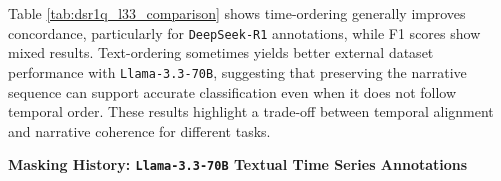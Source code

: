 \vspace{1em}

Table \ref{tab:dsr1q_l33_comparison} shows time-ordering generally improves concordance, particularly for \texttt{DeepSeek-R1} annotations, while F1 scores show mixed results. Text-ordering sometimes yields better external dataset performance with \texttt{Llama-3.3-70B}, suggesting that preserving the narrative sequence can support accurate classification even when it does not follow temporal order.  These results highlight a trade-off between temporal alignment and narrative coherence for different tasks.



\clearpage
{
\noindent\Large\bfseries\thesection\quad Masking History: \texttt{Llama-3.3-70B} Textual Time Series Annotations
\label{apd:masking_l33_dsr1}}

\vspace{1em}



